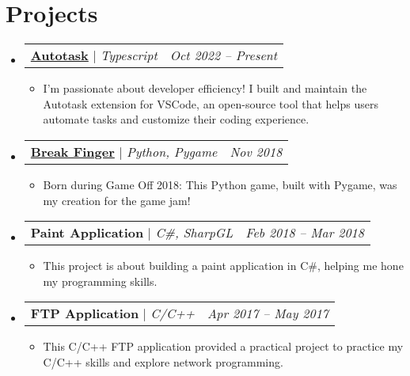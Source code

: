 \documentclass[letterpaper,10pt]{article}
\makeatletter
\newcommand{\subheadingtitlevspace}{
\vspace{-3pt}
}
\newcommand{\resumeItem}[1]{
  \item{
    {#1 \vspace{-4pt}}
  }
}
\newcommand{\titleItem}[1]{
  \textbf{#1}
}
\newcommand{\resumeProjectHeading}[2]{
    \item
    \begin{tabular*}{0.97\textwidth}{l@{\extracolsep{\fill}}r}
      #1 & \textit{ #2} \\
    \end{tabular*}\vspace{-9pt}
}
\newcommand{\resumeSubHeadingListStart}{\subheadingtitlevspace\begin{itemize}[leftmargin=0.15in, label={}]}
\newcommand{\resumeSubHeadingListEnd}{\end{itemize}}
\newcommand{\resumeItemListStart}{
\begin{itemize}}
\newcommand{\resumeItemListEnd}{
\end{itemize}\vspace{-8pt}}
\makeatother
\begin{document}

 \section{Projects}    
     \resumeSubHeadingListStart
        \resumeProjectHeading
           {\titleItem{\href{https://github.com/ludenstian/autotask}{Autotask}} $|$ \emph{Typescript}}{Oct 2022 -- Present}
            \resumeItemListStart
            \resumeItem{I'm passionate about developer efficiency! I built and maintain the Autotask extension for VSCode, an open-source tool that helps users automate tasks and customize their coding experience.}
           \resumeItemListEnd
       \resumeProjectHeading
           {\titleItem{\href{https://nhathuy13598.itch.io/break-finger}{Break Finger}} $|$ \emph{Python, Pygame}}{Nov 2018}
            \resumeItemListStart
            \resumeItem{Born during Game Off 2018: This Python game, built with Pygame, was my creation for the game jam!} 
           \resumeItemListEnd
       \resumeProjectHeading
           {\titleItem{Paint Application} $|$ \emph{C\#, SharpGL}}{Feb 2018 -- Mar 2018}
            \resumeItemListStart
            \resumeItem{This project is about building a paint application in C\#, helping me hone my programming skills.}
           \resumeItemListEnd
        \resumeProjectHeading
           {\titleItem{FTP Application} $|$ \emph{C/C++}}{Apr 2017 -- May 2017}
            \resumeItemListStart
            \resumeItem{This C/C++ FTP application provided a practical project to practice my C/C++ skills and explore network programming.}
           \resumeItemListEnd
     \resumeSubHeadingListEnd

\end{document}
